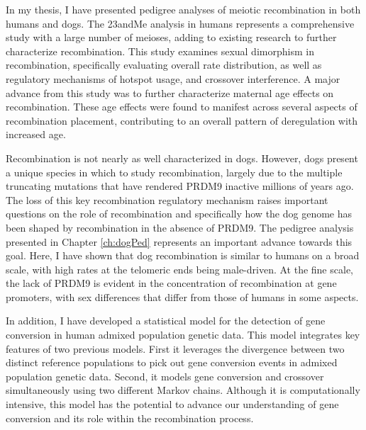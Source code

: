



In my thesis, I have presented pedigree analyses of meiotic recombination in both humans and dogs.
The 23andMe analysis in humans represents a comprehensive study with a large number of meioses, adding to existing research to further characterize recombination. %
This study examines sexual dimorphism in recombination, specifically evaluating overall rate distribution, as well as regulatory mechanisms of hotspot usage, and crossover interference.
A major advance from this study was to further characterize maternal age effects on recombination.
These age effects were found to manifest across several aspects of recombination placement, contributing to an overall pattern of deregulation with increased age.

Recombination is not nearly as well characterized in dogs.
However, dogs present a unique species in which to study recombination, largely due to the multiple truncating mutations that have rendered PRDM9 inactive millions of years ago.
The loss of this key recombination regulatory mechanism raises important questions on the role of recombination and specifically how the dog genome has been shaped by recombination in the absence of PRDM9.
The pedigree analysis presented in Chapter \ref{ch:dogPed} represents an important advance towards this goal.
Here, I have shown that dog recombination is similar to humans on a broad scale, with high rates at the telomeric ends being male-driven.
At the fine scale, the lack of PRDM9 is evident in the concentration of recombination at gene promoters, with sex differences that differ from those of humans in some aspects.

In addition, I have developed a statistical model for the detection of gene conversion in human admixed population genetic data.
This model integrates key features of two previous models.
First it leverages the divergence between two distinct reference populations to pick out gene conversion events in admixed population genetic data.
Second, it models gene conversion and crossover simultaneously using two different Markov chains.
Although it is computationally intensive, this model has the potential to advance our understanding of gene conversion and its role within the recombination process.

